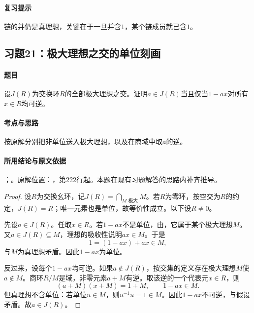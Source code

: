\paragraph{复习提示}

链的并仍是真理想，关键在于一旦并含$1$，某个链成员就已含$1$。



\subsection{习题21：极大理想之交的单位刻画}

\label{ex:3:21}

\paragraph{题目}

设$J(R)$为交换环$R$的全部极大理想之交。证明$a\in J(R)$当且仅当$1-ax$对所有$x\in R$均可逆。

\paragraph{考点与思路}

按原解分别把非单位送入极大理想，以及在商域中取$a$的逆。

\paragraph{所用结论与原文依据}

；。原解位置：，第222行起。本题在现有习题解答的思路内补齐推导。


\begin{proof}

设$R$为交换幺环，记$J(R)=\bigcap_{M\text{ 极大}}M$。若$R$为零环，按空交为$R$的约定，$J(R)=R$；唯一元素也是单位，故等价性成立。以下设$R\ne0$。

先设$a\in J(R)$。任取$x\in R$。若$1-ax$不是单位，由，它属于某个极大理想$M$。又$a\in J(R)\subseteq M$，理想的吸收性说明$ax\in M$。于是
\[
1=(1-ax)+ax\in M,
\]
与$M$为真理想矛盾。因此$1-ax$为单位。

反过来，设每个$1-ax$均可逆。如果$a\notin J(R)$，按交集的定义存在极大理想$M$使$a\notin M$。商环$R/M$是域，非零元素$a+M$有逆。取该逆的一个代表元$x\in R$，则
\[
(a+M)(x+M)=1+M,\qquad 1-ax\in M.
\]
但真理想不含单位：若单位$u\in M$，则$u^{-1}u=1\in M$。因此$1-ax$不可逆，与假设矛盾。故$a\in J(R)$。

\end{proof}

